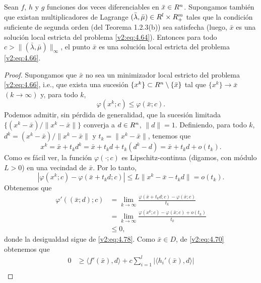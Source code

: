 \begin{theorem}\label{v2:thm:4.3.6}
    Sean $f$, $h$ y $g$ funciones dos veces diferenciables en $\bar{x} \in R^n$. Supongamos también que existan multiplicadores de Lagrange $(\bar{\lambda}, \bar{\mu}) \in R^l \times R^m_+$ tales que la condición suficiente de segunda orden (del Teorema 1.2.3(b)) sea satisfecha (luego, $\bar{x}$ es una solución local estricta del problema \eqref{v2:eq:4.64}).
    Entonces para todo $c > \|(\bar{\lambda}, \bar{\mu})\|_\infty$, el punto $\bar{x}$ es una solución local estricta del problema \eqref{v2:eq:4.66}.
\end{theorem}
\begin{proof}
    Supongamos que $\bar{x}$ no sea un minimizador local estricto del problema \eqref{v2:eq:4.66}, i.e., que exista una sucesión $\{x^k\} \subset R^n \setminus \{\bar{x}\}$ tal que $\{x^k\} \to \bar{x}$ $(k \to \infty)$ y, para todo $k$,
    \begin{equation}
        \varphi(x^k; c) \le \varphi(\bar{x}; c).
        \label{v2:eq:4.78}
    \end{equation}
    Podemos admitir, sin pérdida de generalidad, que la sucesión limitada $\{(x^k - \bar{x})/\|x^k - \bar{x}\|\}$ converja a $d \in R^n$, $\|d\| = 1$. Definiendo, para todo $k$, $d^k = (x^k - \bar{x})/\|x^k - \bar{x}\|$ y $t_k = \|x^k - \bar{x}\|$, tenemos que
    \[
        x^k = \bar{x} + t_k d^k = \bar{x} + t_k d + t_k(d^k - d) = \bar{x} + t_k d + o(t_k).
    \]
    Como es fácil ver, la función $\varphi(\cdot; c)$ es Lipschitz-continua (digamos, con módulo $L > 0$) en una vecindad de $\bar{x}$. Por lo tanto,
    \[
        |\varphi(x^k; c) - \varphi(\bar{x} + t_k d; c)| \le L\|x^k - \bar{x} - t_k d\| = o(t_k).
    \]
    Obtenemos que
    \begin{align*}
        \varphi'((\bar{x}; d); c) &= \lim_{k \to \infty} \frac{\varphi(\bar{x} + t_k d; c) - \varphi(\bar{x}; c)}{t_k} \\
        &= \lim_{k \to \infty} \frac{\varphi(x^k; c) - \varphi(\bar{x}; c) + o(t_k)}{t_k} \\
        &\le 0,
    \end{align*}
    donde la desigualdad sigue de \eqref{v2:eq:4.78}. Como $\bar{x} \in D$, de \eqref{v2:eq:4.70} obtenemos que
    \begin{align}
        0 &\ge \langle f'(\bar{x}), d \rangle + c \sum_{i=1}^l |\langle h_i'(\bar{x}), d \rangle| \nonumber \\

\end{align}
\end{proof}
